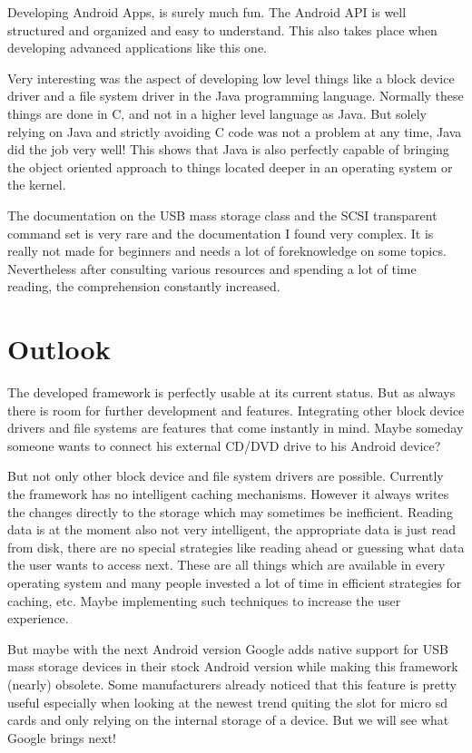 Developing Android Apps, is surely much fun. The Android API is well structured and organized and easy to understand. This also takes place when developing advanced applications like this one. 

Very interesting was the aspect of developing low level things like a block device driver and a file system driver in the Java programming language. Normally these things are done in C, and not in a higher level language as Java. But solely relying on Java and strictly avoiding C code was not a problem at any time, Java did the job very well! This shows that Java is also perfectly capable of bringing the object oriented approach to things located deeper in an operating system or the kernel.

The documentation on the USB mass storage class and the SCSI transparent command set is very rare and the documentation I found very complex. It is really not made for beginners and needs a lot of foreknowledge on some topics. Nevertheless after consulting various resources and spending a lot of time reading, the comprehension constantly increased.

\chapter{Outlook}

The developed framework is perfectly usable at its current status. But as always there is room for further development and features. Integrating other block device drivers and file systems are features that come instantly in mind. Maybe someday someone wants to connect his external CD/DVD drive to his Android device?

But not only other block device and file system drivers are possible. Currently the framework has no intelligent caching mechanisms. However it always writes the changes directly to the storage which may sometimes be inefficient. Reading data is at the moment also not very intelligent, the appropriate data is just read from disk, there are no special strategies like reading ahead or guessing what data the user wants to access next. These are all things which are available in every operating system and many people invested a lot of time in efficient strategies for caching, etc. Maybe implementing such techniques to increase the user experience.

But maybe with the next Android version Google adds native support for USB mass storage devices in their stock Android version while making this framework (nearly) obsolete. Some manufacturers already noticed that this feature is pretty useful especially when looking at the newest trend quiting the slot for micro sd cards and only relying on the internal storage of a device. But we will see what Google brings next!